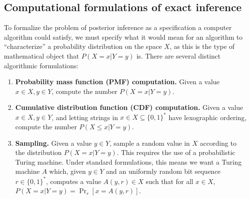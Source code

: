 \documentclass{article}
\theoremstyle{definition}
\theoremstyle{remark}
\begin{document}
\subsection{Computational formulations of exact inference}
To formalize the problem of posterior inference as a specification a computer algorithm could satisfy, we must specify what it would mean for an algorithm to ``characterize'' a probability distribution on the space $X$, as this is the type of mathematical object that $P(X = x | Y = y)$ is.
There are several distinct algorithmic formulations:
\begin{enumerate}
    \item \textbf{Probability mass function (PMF) computation.} Given a value $x \in X, y \in Y$, compute the number $P(X = x | Y = y)$.
    \item \textbf{Cumulative distribution function (CDF) computation.} Given a value $x \in X, y \in Y$, and letting strings in $x \in X \subseteq \{0, 1\}^*$ have lexographic ordering, compute the number $P(X \leq x | Y = y)$.
    \item \textbf{Sampling.} Given a value $y \in Y$, sample a random value in $X$ according to the distribution $P(X = x | Y = y)$.  This requires the use of a probabilistic Turing machine.  Under standard formulations, this means we want a Turing machine $A$ which, given $y \in Y$ and an uniformly random bit sequence $r \in \{0, 1\}^*$, computes a value $A(y, r) \in X$ such that for all $x \in X$, $P(X = x | Y = y) = \Pr_r[x = A(y, r)]$.
\end{enumerate}

\end{document}
